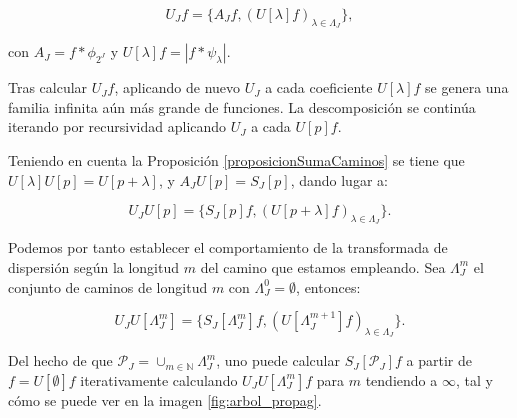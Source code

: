 $$U_Jf=\lbrace A_Jf, (U[\lambda]f)_{\lambda\in\Lambda_J} \rbrace,$$

\noindent con $A_J=f\ast \phi_{2^J}$ y $U[\lambda]f=\left| f\ast \psi_\lambda \right|$. 

\medskip

\noindent Tras calcular $U_Jf$, aplicando de nuevo $U_J$ a cada coeficiente $U[\lambda]f$ se genera una familia infinita aún más grande de funciones. La descomposición se continúa iterando  por recursividad aplicando $U_J$ a cada $U[p]f$. 

\medskip

\noindent Teniendo en cuenta la Proposición \ref{proposicionSumaCaminos} se tiene que  $U[\lambda]U[p]=U[p+\lambda]$, y $A_JU[p]=S_J[p]$, dando lugar a: 

\begin{equation}
  U_J U[p]=\lbrace S_J[p]f,(U[p+\lambda]f)_{\lambda\in\Lambda_J}\rbrace. 
\end{equation}



\medskip

\noindent Podemos por tanto establecer el comportamiento de la transformada de dispersión según la longitud $m$ del camino que estamos empleando. Sea $\Lambda_J^m$ el conjunto de caminos de longitud $m$ con $\Lambda_J^0={\emptyset}$, entonces:


\begin{equation} \label{eq::1.5}
  U_J U[\Lambda_J^m]=\lbrace S_J[\Lambda_J^m]f,(U[\Lambda_J^{m+1}]f)_{\lambda\in\Lambda_J}\rbrace.
\end{equation}

\noindent Del hecho de que $\mathcal{P}_J=\cup_{m\in \mathbb{N}}\Lambda_J^m$, uno puede calcular $S_J[\mathcal{P}_J]f$ a partir de $f=U[\emptyset]f$ iterativamente calculando $U_J U[\Lambda_J^m]f$ para $m$ tendiendo a $\infty$, tal y cómo se puede ver en la imagen \autoref{fig:arbol_propag}. 

